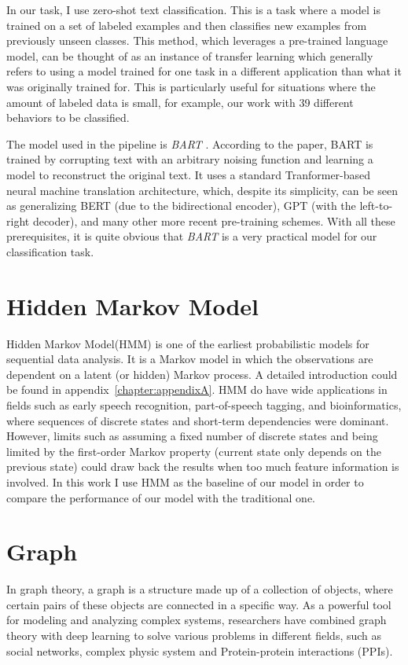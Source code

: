 In our task, I use zero-shot text classification. This is a task where a model is trained on a set of labeled examples and then classifies new examples from previously unseen classes. This method, which leverages a pre-trained language model, can be thought of as an instance of transfer learning which generally refers to using a model trained for one task in a different application than what it was originally trained for. This is particularly useful for situations where the amount of labeled data is small, for example, our work with 39 different behaviors to be classified.

The model used in the pipeline is \textit{BART} \cite{lewis2019bartdenoisingsequencetosequencepretraining}. According to the paper, BART is trained by corrupting text with an arbitrary noising function and learning a model to reconstruct the original text. It uses a standard Tranformer-based neural machine translation architecture, which, despite its simplicity, can be seen as generalizing BERT (due to the bidirectional encoder), GPT (with the left-to-right decoder), and many other more recent pre-training schemes. With all these prerequisites, it is quite obvious that \textit{BART} is a very practical model for our classification task.



\section{Hidden Markov Model}
Hidden Markov Model(HMM) \cite{rabiner1989tutorial,baum1972inequality} is one of the earliest probabilistic models for sequential data analysis. It is a Markov model in which the observations are dependent on a latent (or hidden) Markov process. A detailed introduction could be found in appendix~\ref{chapter:appendixA}. HMM do have wide applications in fields such as early speech recognition, part-of-speech tagging, and bioinformatics, where sequences of discrete states and short-term dependencies were dominant. However, limits such as assuming a fixed number of discrete states and being limited by the first-order Markov property (current state only depends on the previous state) could draw back the results when too much feature information is involved. In this work I use HMM as the baseline of our model in order to compare the performance of our model with the traditional one.
\section{Graph}
\label{sec:graph}
In graph theory, a graph is a structure made up of a collection of objects, where certain pairs of these objects are connected in a specific way\cite{zhou2020graph}. As a powerful tool for modeling and analyzing complex systems, researchers have combined graph theory with deep learning to solve various problems in different fields, such as social networks\cite{wu2020graph}, complex physic system\cite{sanchez2018graph} and Protein-protein interactions (PPIs)\cite{NIPS2017_f5077839}.

